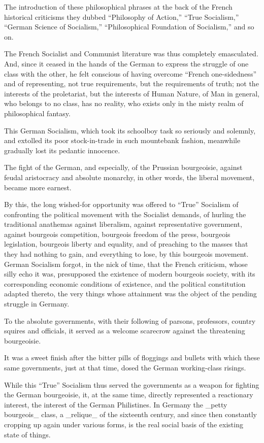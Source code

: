 The introduction of these philosophical phrases at the back of the
French historical criticisms they dubbed “Philosophy of Action,” “True
Socialism,” “German Science of Socialism,” “Philosophical Foundation of
Socialism,” and so on.

The French Socialist and Communist literature was thus completely
emasculated. And, since it ceased in the hands of the German to express
the struggle of one class with the other, he felt conscious of having
overcome “French one-sidedness” and of representing, not true
requirements, but the requirements of truth; not the interests of the
proletariat, but the interests of Human Nature, of Man in general, who
belongs to no class, has no reality, who exists only in the misty realm
of philosophical fantasy.

This German Socialism, which took its schoolboy task so seriously and
solemnly, and extolled its poor stock-in-trade in such mountebank
fashion, meanwhile gradually lost its pedantic innocence.

The fight of the German, and especially, of the Prussian bourgeoisie,
against feudal aristocracy and absolute monarchy, in other words, the
liberal movement, became more earnest.

By this, the long wished-for opportunity was offered to “True”
Socialism of confronting the political movement with the Socialist
demands, of hurling the traditional anathemas against liberalism,
against representative government, against bourgeois competition,
bourgeois freedom of the press, bourgeois legislation, bourgeois
liberty and equality, and of preaching to the masses that they had
nothing to gain, and everything to lose, by this bourgeois movement.
German Socialism forgot, in the nick of time, that the French
criticism, whose silly echo it was, presupposed the existence of modern
bourgeois society, with its corresponding economic conditions of
existence, and the political constitution adapted thereto, the very
things whose attainment was the object of the pending struggle in
Germany.

To the absolute governments, with their following of parsons,
professors, country squires and officials, it served as a welcome
scarecrow against the threatening bourgeoisie.

It was a sweet finish after the bitter pills of floggings and bullets
with which these same governments, just at that time, dosed the German
working-class risings.

While this “True” Socialism thus served the governments as a weapon for
fighting the German bourgeoisie, it, at the same time, directly
represented a reactionary interest, the interest of the German
Philistines. In Germany the _petty bourgeois_ class, a _relique_ of the
sixteenth century, and since then constantly cropping up again under
various forms, is the real social basis of the existing state of
things.

